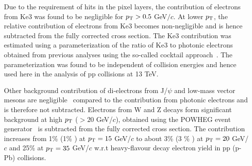 Due to the requirement of hits in the pixel layers, the contribution of electrons from Ke3 was found to be negligible for $p_{\rm{T}} > 0.5$ GeV$/c$. At lower $p_{\rm{T}}$, the relative contribution of electrons from Ke3 becomes non-negligible and is hence subtracted from the fully corrected cross section. The Ke3 contribution was estimated using a parameterization of the ratio of Ke3 to photonic electrons obtained from previous analyses using the so-called cocktail approach~\cite{Acharya:2018upq,Abelev:2014gla,Abelev:2012xe}. The parameterization was found to be independent of collision energies and hence used here in the analysis of pp collisions at 13 TeV. 

Other background contribution of  di-electrons from J/$\psi$ and low-mass vector mesons are negligible~\cite{Acharya:2018upq} compared to the contribution from photonic electrons and is therefore not subtracted. Electrons from W and Z decays form significant background at high $p_{\rm{T}}$ ($>20$ GeV/$c$), obtained using the POWHEG event generator~\cite{Oleari:2010nx} is subtracted from the fully corrected cross section. The contribution increases from 1\% (1\% ) at $p_{\rm{T}} = 15$ GeV/$c$ to
about {3\%} (3 \% ) at $p_{\rm{T}} = 20$ GeV/$c$ and 25\% at $p_{\rm{T}} = 35$ GeV/$c$ w.r.t heavy-flavour decay electron yield in pp  (p-Pb) collisions.





